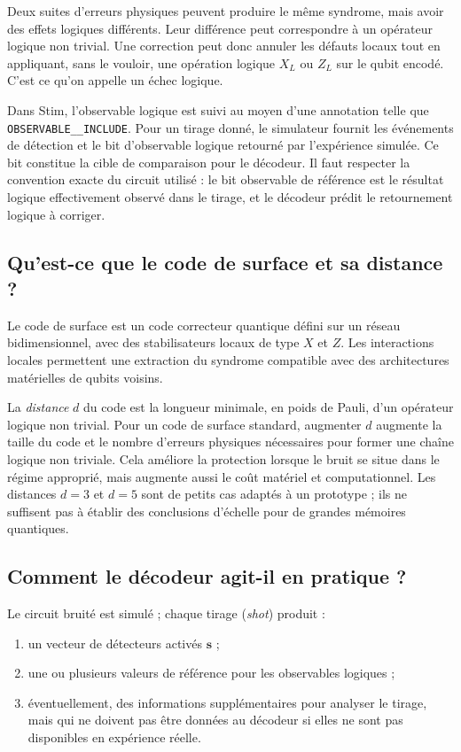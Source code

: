 \documentclass[11pt,a4paper]{article}
\begin{document}
Deux suites d'erreurs physiques peuvent produire le même syndrome, mais
avoir des effets logiques différents. Leur différence peut correspondre à
un opérateur logique non trivial. Une correction peut donc annuler les
défauts locaux tout en appliquant, sans le vouloir, une opération logique
$X_L$ ou $Z_L$ sur le qubit encodé. C'est ce qu'on appelle un échec logique.

Dans Stim, l'observable logique est suivi au moyen d'une annotation telle
que \texttt{OBSERVABLE\__INCLUDE}. Pour un tirage donné, le simulateur
fournit les événements de détection et le bit d'observable logique retourné
par l'expérience simulée. Ce bit constitue la cible de comparaison pour le
décodeur. Il faut respecter la convention exacte du circuit utilisé :
le bit observable de référence est le résultat logique effectivement observé
dans le tirage, et le décodeur prédit le retournement logique à corriger.

\subsection{Qu'est-ce que le code de surface et sa distance ?}

Le code de surface est un code correcteur quantique défini sur un réseau
bidimensionnel, avec des stabilisateurs locaux de type $X$ et $Z$. Les
interactions locales permettent une extraction du syndrome compatible avec
des architectures matérielles de qubits voisins.

La \emph{distance} $d$ du code est la longueur minimale, en poids de Pauli,
d'un opérateur logique non trivial. Pour un code de surface standard,
augmenter $d$ augmente la taille du code et le nombre d'erreurs physiques
nécessaires pour former une chaîne logique non triviale. Cela améliore la
protection lorsque le bruit se situe dans le régime approprié, mais augmente
aussi le coût matériel et computationnel. Les distances $d=3$ et $d=5$ sont
de petits cas adaptés à un prototype ; ils ne suffisent pas à établir des
conclusions d'échelle pour de grandes mémoires quantiques.

\subsection{Comment le décodeur agit-il en pratique ?}

Le circuit bruité est simulé ; chaque tirage (\emph{shot}) produit :
\begin{enumerate}
  \item un vecteur de détecteurs activés $\mathbf s$ ;
  \item une ou plusieurs valeurs de référence pour les observables logiques ;
  \item éventuellement, des informations supplémentaires pour analyser le
  tirage, mais qui ne doivent pas être données au décodeur si elles ne sont
  pas disponibles en expérience réelle.
\end{enumerate}
\end{document}
